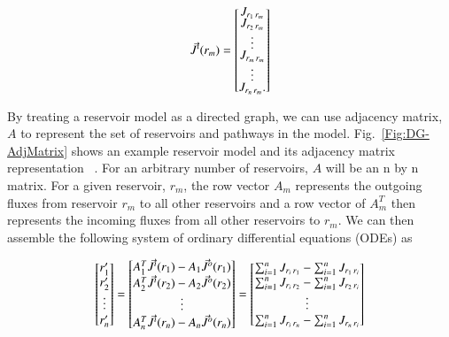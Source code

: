 \begin{equation}
\vec{J}^{i}(r_m) =
\renewcommand\arraystretch{0.5}
\begin{bmatrix}
    \flux{r_1}{r_m} \\
    \flux{r_2}{r_m} \\
    \vdots \\
    \flux{r_m}{r_m} \\
    \vdots \\
    \flux{r_n}{r_m}.
\end{bmatrix}
\end{equation}

By treating a reservoir model as a directed graph, we can use adjacency matrix, $A$ to represent the set of reservoirs and pathways in the model. Fig.~\ref{Fig:DG-AdjMatrix} shows an example reservoir model and its adjacency matrix representation ~\citep{CTH:2009}. For an arbitrary number of reservoirs, $A$ will be an n by n matrix. For a given reservoir, $r_m$, the row vector $A_m$ represents the outgoing fluxes from reservoir $r_m$ to all other reservoirs and a row vector of $A^{T}_{m}$ then represents the incoming fluxes from all other reservoirs to $r_m$. We can then assemble the following system of ordinary differential equations (ODEs) as

\begin{equation}
\renewcommand\arraystretch{1.0}
\begin{bmatrix}
    r_1' \\
    r_2' \\
    \vdots \\
    r_n'
\end{bmatrix}
=
\renewcommand\arraystretch{1.0}
\begin{bmatrix}
    A^T_1\vec{J}^{i}(r_1) - A_1\vec{J}^{o}(r_1) \\
    A^T_2\vec{J}^{i}(r_2) - A_2\vec{J}^{o}(r_2) \\
    \vdots  \\
    A^T_n\vec{J}^{i}(r_n) - A_n\vec{J}^{o}(r_n) \\
\end{bmatrix}
=
\renewcommand\arraystretch{1.0}
\begin{bmatrix}
    \sum_{i=1}^n \flux{r_i}{r_1} - \sum_{i=1}^n \flux{r_1}{r_i} \\
    \sum_{i=1}^n \flux{r_i}{r_2} - \sum_{i=1}^n \flux{r_2}{r_i} \\
    \vdots  \\
    \sum_{i=1}^n \flux{r_i}{r_n} - \sum_{i=1}^n \flux{r_n}{r_i}
\end{bmatrix}
\end{equation}

